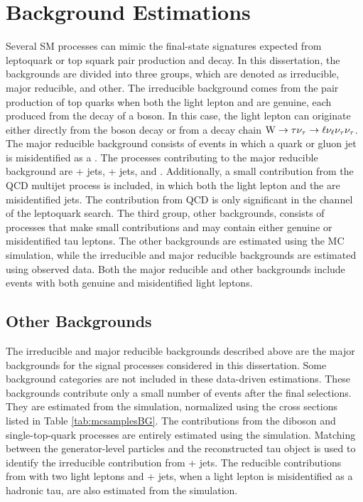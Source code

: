 \section{Background Estimations
\label{sec:background}}

Several SM processes can mimic the final-state signatures expected from leptoquark or top squark pair production and decay. In this dissertation, the backgrounds are divided into three groups, which are denoted as \ttbar irreducible, major reducible, and other. The \ttbar irreducible background comes from the pair production of top quarks when both the light lepton and \tauh are genuine, each produced from the decay of a \W boson. In this case, the light lepton can originate either directly from the \W boson decay or from a decay chain $\mathrm{W} \rightarrow \tau  \nu_{\tau} \rightarrow \ell\nu_{\ell} \nu_{\tau} \nu_{\tau}$. The major reducible background consists of events in which a quark or gluon jet is
misidentified as a \tauh. The processes contributing to the major reducible background are \W + jets, \Z + jets, and \ttbar. Additionally, a small contribution from the QCD multijet process is included, in which both the light lepton and the \tauh are misidentified jets. The contribution from QCD is only significant in the \etau channel of the leptoquark search. The third group, other backgrounds, consists of processes that make small contributions and may contain either genuine or misidentified tau leptons. The other backgrounds are estimated using the MC simulation, while the \ttbar irreducible and major reducible backgrounds are estimated using observed data. Both the major reducible and other backgrounds include events with both genuine and misidentified light leptons.






\subsection{Other Backgrounds}

The \ttbar irreducible and major reducible backgrounds described above are the major backgrounds for the signal processes considered in this dissertation. Some background categories are not included in these data-driven estimations. These backgrounds contribute only a small number of events after the final selections. They are estimated from the simulation, normalized using the cross sections listed in Table \ref{tab:mcsamplesBG}. The contributions from the diboson and single-top-quark processes are entirely estimated using the simulation. Matching between the generator-level particles and the reconstructed tau object is used to identify the irreducible contribution from \Ztt + jets. The reducible contributions from \ttbar with two light leptons and \Zll + jets, when a light lepton is misidentified as a hadronic tau, are also estimated from the simulation.